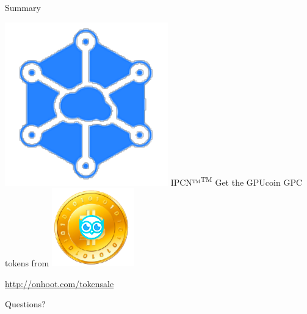 \documentclass[10pt,handout]{beamer}
\begin{document}
\begin{frame}{Summary}

\includegraphics[scale=.4]{static/ipcn-p2p}
IPCN™\textsuperscript{TM} Get the GPUcoin GPC tokens from
\includegraphics[scale=0.4]{static/hootcoin} 
 \begin{center}\url{http://onhoot.com/tokensale}\end{center}




 \begin{center}\ccbysa\end{center}

\end{frame}

\begin{frame}[standout]
 Questions?
\end{frame}
\end{document}
